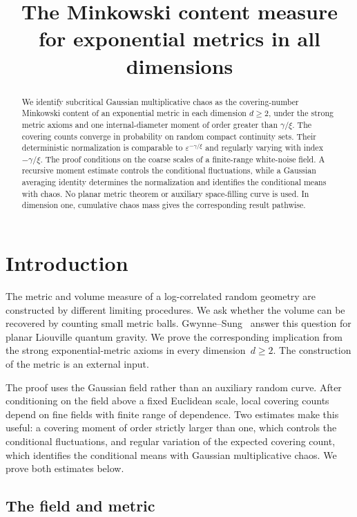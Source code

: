 \documentclass[11pt,letterpaper]{article}
\title{The Minkowski content measure for exponential metrics in all dimensions}
\author{}
\date{}
\theoremstyle{definition}
\theoremstyle{remark}
\numberwithin{equation}{section}
\begin{document}
\maketitle

\begin{abstract}
We identify subcritical Gaussian multiplicative chaos as the covering-number Minkowski content of an exponential metric in each dimension $d\ge2$, under the strong metric axioms and one internal-diameter moment of order greater than $\gamma/\xi$. The covering counts converge in probability on random compact continuity sets. Their deterministic normalization is comparable to $\varepsilon^{-\gamma/\xi}$ and regularly varying with index $-\gamma/\xi$. The proof conditions on the coarse scales of a finite-range white-noise field. A recursive moment estimate controls the conditional fluctuations, while a Gaussian averaging identity determines the normalization and identifies the conditional means with chaos. No planar metric theorem or auxiliary space-filling curve is used. In dimension one, cumulative chaos mass gives the corresponding result pathwise.
\end{abstract}

\setcounter{tocdepth}{1}
\tableofcontents
\clearpage

\section{Introduction}

The metric and volume measure of a log-correlated random geometry are constructed by different limiting procedures. We ask whether the volume can be recovered by counting small metric balls. Gwynne--Sung~\cite[Theorem~1.1 and Proposition~1.3]{GS} answer this question for planar Liouville quantum gravity. We prove the corresponding implication from the strong exponential-metric axioms in every dimension~$d\ge2$. The construction of the metric is an external input.

The proof uses the Gaussian field rather than an auxiliary random curve. After conditioning on the field above a fixed Euclidean scale, local covering counts depend on fine fields with finite range of dependence. Two estimates make this useful: a covering moment of order strictly larger than one, which controls the conditional fluctuations, and regular variation of the expected covering count, which identifies the conditional means with Gaussian multiplicative chaos. We prove both estimates below.

\subsection{The field and metric}
\end{document}
